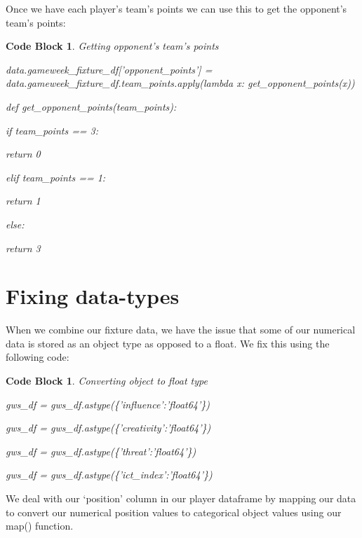 \documentclass[12pt, a4paper, oneside]{book}
\newtheorem{codeblock}[theorem]{Code Block}
\numberwithin{equation}{section}
\begin{document}
Once we have each player's team's points we can use this to get the opponent's team's points:

\begin{codeblock}
  Getting opponent's team's points
  
  data.gameweek\_fixture\_df['opponent\_points'] = data.gameweek\_fixture\_df.team\_points.apply(lambda x: get\_opponent\_points(x))

  def get\_opponent\_points(team\_points):
  
  \hspace{\parindent}if team\_points == 3:
  
  \hspace{\parindent}\hspace{\parindent}return 0
  
  \hspace{\parindent}elif team\_points == 1:
  
  \hspace{\parindent}\hspace{\parindent}return 1
  
  \hspace{\parindent}else:
  
  \hspace{\parindent}\hspace{\parindent}return 3
\end{codeblock}

\section{Fixing data-types}\label{sec:4.3}

When we combine our fixture data, we have the issue that some of our numerical data is stored as an object type as opposed to a float. We fix this using the following code:

\begin{codeblock}
  Converting object to float type

  gws\_df = gws\_df.astype(\{'influence':'float64'\})
  
  gws\_df = gws\_df.astype(\{'creativity':'float64'\})
  
  gws\_df = gws\_df.astype(\{'threat':'float64'\})
  
  gws\_df = gws\_df.astype(\{'ict\_index':'float64'\})
\end{codeblock}

We deal with our `position' column in our player dataframe by mapping our data to convert our numerical position values to categorical object values using our map() function. 
\end{document}
